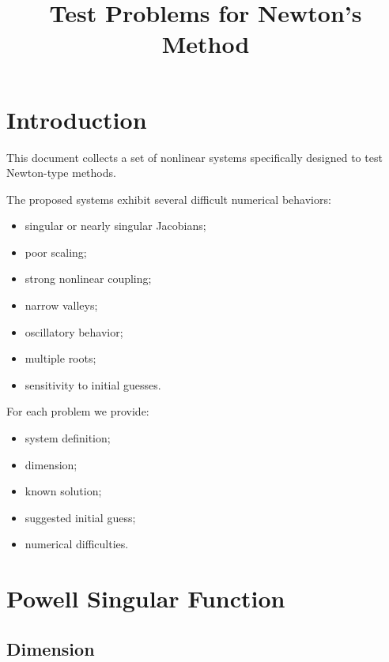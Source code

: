 \documentclass[11pt,a4paper]{article}
\title{Test Problems for Newton's Method}
\author{}
\date{}
\begin{document}
\maketitle

\tableofcontents

\newpage

\section{Introduction}

This document collects a set of nonlinear systems specifically designed to test Newton-type methods.

The proposed systems exhibit several difficult numerical behaviors:

\begin{itemize}
  \item singular or nearly singular Jacobians;
  \item poor scaling;
  \item strong nonlinear coupling;
  \item narrow valleys;
  \item oscillatory behavior;
  \item multiple roots;
  \item sensitivity to initial guesses.
\end{itemize}

For each problem we provide:
\begin{itemize}
  \item system definition;
  \item dimension;
  \item known solution;
  \item suggested initial guess;
  \item numerical difficulties.
\end{itemize}

\section{Powell Singular Function}

\subsection*{Dimension}
\end{document}
